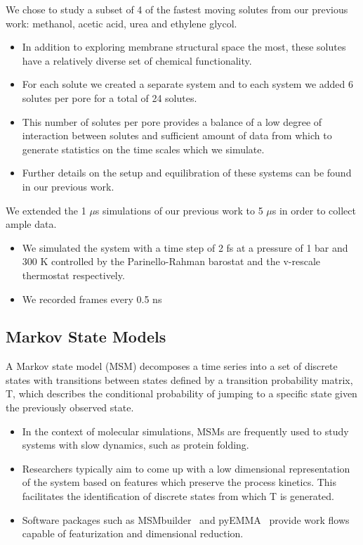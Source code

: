 \documentclass{article}
\begin{document}
  We chose to study a subset of 4 of the fastest moving solutes from our previous
  work: methanol, acetic acid, urea and ethylene glycol.
  \begin{itemize} 
    \item In addition to exploring membrane structural space the most, these solutes
    have a relatively diverse set of chemical functionality.   
    \item For each solute we created a separate system and to each system we
    added 6 solutes per pore for a total of 24 solutes.
    \item This number of solutes per pore provides a balance of a low 
    degree of interaction between solutes and sufficient amount of data from
    which to generate statistics on the time scales which we simulate.
    \item Further details on the setup and equilibration of these systems can
    be found in our previous work.\cite{coscia_chemically_2019}
  \end{itemize}
  
  \noindent We extended the 1 $\mu$s simulations of our previous work to 5 $\mu$s in order
  to collect ample data.
  \begin{itemize}
    \item We simulated the system with a time step of 2 fs at a pressure of 1 bar
    and 300 K controlled by the Parinello-Rahman barostat and the v-rescale thermostat
    respectively.
    \item We recorded frames every 0.5 ns
  \end{itemize}
  
  \subsection{Markov State Models}\label{method:MSMs}  %
  
  A Markov state model (MSM) decomposes a time series into a set of discrete states
  with transitions between states defined by a transition probability matrix, T,
  which describes the conditional probability of jumping to a specific 
  state given the previously observed state.~\cite{pande_everything_2010,wehmeyer_introduction_2018}
  \begin{itemize}
    \item In the context of molecular simulations, MSMs are frequently used
    to study systems with slow dynamics, such as protein folding.~\cite{snow_how_2005,chodera_automatic_2007} %
    \item Researchers typically aim to come up with a low dimensional 
    representation of the system based on features which preserve the process
    kinetics. This facilitates the identification of discrete states from
    which T is generated.
    \item Software packages such as MSMbuilder~\cite{beauchamp_msmbuilder2:_2011}
    and pyEMMA~\cite{scherer_pyemma_2015} provide work flows capable 
    of featurization and dimensional reduction.
  \end{itemize}
\end{document}

